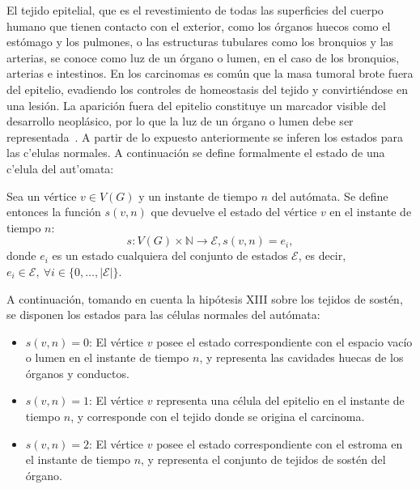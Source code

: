 El tejido epitelial, que es el revestimiento de todas las superficies del cuerpo humano que tienen contacto con el exterior, como los órganos huecos como el estómago y los pulmones, o las estructuras tubulares como los bronquios y las arterias, se conoce como luz de un órgano o lumen, en el caso de los bronquios, arterias e intestinos. En los carcinomas es común que la masa tumoral brote fuera del epitelio, evadiendo los controles de homeostasis del tejido y convirtiéndose en una lesión. La aparición fuera del epitelio constituye un marcador visible del desarrollo neoplásico, por lo que la luz de un órgano o lumen debe ser representada~\cite{robins,stomach,lung,liver,breast}. A partir de lo expuesto anteriormente se inferen los estados para las c'elulas normales. A continuación se define formalmente el estado de una c'elula del aut'omata:

\begin{definition}
\label{def-cellstatus}
Sea un v\'ertice $v \in V(G)$ y un instante de tiempo $n$ del aut\'omata. Se define entonces la funci\'on $s(v,n)$ que devuelve el estado del v\'ertice $v$ en el instante de tiempo $n$:
\begin{subequations}
\begin{equation}
s: V(G) \times \mathbb{N} \rightarrow \mathcal{E}, \label{eq-cellstatus}
\end{equation}
\begin{equation}
s(v,n) = e_i, \label{eq-cellstatus-2}
\end{equation}
\end{subequations}
donde $e_i$ es un estado cualquiera del conjunto de estados $\mathcal{E}$, es decir, $e_i \in \mathcal{E},~\forall i \in \lbrace 0, \ldots, |\mathcal{E}| \rbrace$.
\end{definition}

A continuaci\'on, tomando en cuenta la hip\'otesis XIII sobre los tejidos de sost\'en, se disponen los estados para las c\'elulas normales del aut\'omata:

\begin{itemize}
\item $s(v,n)=0$: El v\'ertice $v$ posee el estado correspondiente con el espacio vac\'io o lumen en el instante de tiempo $n$, y representa las cavidades huecas de los \'organos y conductos.

\item $s(v,n)=1$: El v\'ertice $v$ representa una c\'elula del epitelio en el instante de tiempo $n$, y corresponde con el tejido donde se origina el carcinoma.

\item $s(v,n)=2$: El v\'ertice $v$ posee el estado correspondiente con el estroma en el instante de tiempo $n$, y representa el conjunto de tejidos de sost\'en del \'organo.
\end{itemize}

